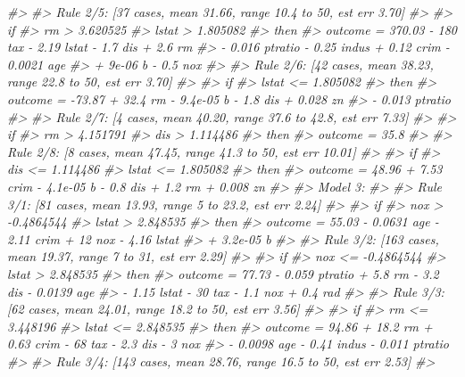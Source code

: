 \documentclass[]{book}
\newenvironment{Shaded}{\begin{snugshade}}{\end{snugshade}}
\newcommand{\CommentTok}[1]{\textcolor[rgb]{0.56,0.35,0.01}{\textit{#1}}}
\begin{document}
\begin{Shaded}
\begin{Highlighting}[]
\CommentTok{#> }
\CommentTok{#>   Rule 2/5: [37 cases, mean 31.66, range 10.4 to 50, est err 3.70]}
\CommentTok{#> }
\CommentTok{#>     if}
\CommentTok{#>  rm > 3.620525}
\CommentTok{#>  lstat > 1.805082}
\CommentTok{#>     then}
\CommentTok{#>  outcome = 370.03 - 180 tax - 2.19 lstat - 1.7 dis + 2.6 rm}
\CommentTok{#>            - 0.016 ptratio - 0.25 indus + 0.12 crim - 0.0021 age}
\CommentTok{#>            + 9e-06 b - 0.5 nox}
\CommentTok{#> }
\CommentTok{#>   Rule 2/6: [42 cases, mean 38.23, range 22.8 to 50, est err 3.70]}
\CommentTok{#> }
\CommentTok{#>     if}
\CommentTok{#>  lstat <= 1.805082}
\CommentTok{#>     then}
\CommentTok{#>  outcome = -73.87 + 32.4 rm - 9.4e-05 b - 1.8 dis + 0.028 zn}
\CommentTok{#>            - 0.013 ptratio}
\CommentTok{#> }
\CommentTok{#>   Rule 2/7: [4 cases, mean 40.20, range 37.6 to 42.8, est err 7.33]}
\CommentTok{#> }
\CommentTok{#>     if}
\CommentTok{#>  rm > 4.151791}
\CommentTok{#>  dis > 1.114486}
\CommentTok{#>     then}
\CommentTok{#>  outcome = 35.8}
\CommentTok{#> }
\CommentTok{#>   Rule 2/8: [8 cases, mean 47.45, range 41.3 to 50, est err 10.01]}
\CommentTok{#> }
\CommentTok{#>     if}
\CommentTok{#>  dis <= 1.114486}
\CommentTok{#>  lstat <= 1.805082}
\CommentTok{#>     then}
\CommentTok{#>  outcome = 48.96 + 7.53 crim - 4.1e-05 b - 0.8 dis + 1.2 rm + 0.008 zn}
\CommentTok{#> }
\CommentTok{#> Model 3:}
\CommentTok{#> }
\CommentTok{#>   Rule 3/1: [81 cases, mean 13.93, range 5 to 23.2, est err 2.24]}
\CommentTok{#> }
\CommentTok{#>     if}
\CommentTok{#>  nox > -0.4864544}
\CommentTok{#>  lstat > 2.848535}
\CommentTok{#>     then}
\CommentTok{#>  outcome = 55.03 - 0.0631 age - 2.11 crim + 12 nox - 4.16 lstat}
\CommentTok{#>            + 3.2e-05 b}
\CommentTok{#> }
\CommentTok{#>   Rule 3/2: [163 cases, mean 19.37, range 7 to 31, est err 2.29]}
\CommentTok{#> }
\CommentTok{#>     if}
\CommentTok{#>  nox <= -0.4864544}
\CommentTok{#>  lstat > 2.848535}
\CommentTok{#>     then}
\CommentTok{#>  outcome = 77.73 - 0.059 ptratio + 5.8 rm - 3.2 dis - 0.0139 age}
\CommentTok{#>            - 1.15 lstat - 30 tax - 1.1 nox + 0.4 rad}
\CommentTok{#> }
\CommentTok{#>   Rule 3/3: [62 cases, mean 24.01, range 18.2 to 50, est err 3.56]}
\CommentTok{#> }
\CommentTok{#>     if}
\CommentTok{#>  rm <= 3.448196}
\CommentTok{#>  lstat <= 2.848535}
\CommentTok{#>     then}
\CommentTok{#>  outcome = 94.86 + 18.2 rm + 0.63 crim - 68 tax - 2.3 dis - 3 nox}
\CommentTok{#>            - 0.0098 age - 0.41 indus - 0.011 ptratio}
\CommentTok{#> }
\CommentTok{#>   Rule 3/4: [143 cases, mean 28.76, range 16.5 to 50, est err 2.53]}
\CommentTok{#> }

\end{Highlighting}
\end{Shaded}
\end{document}
